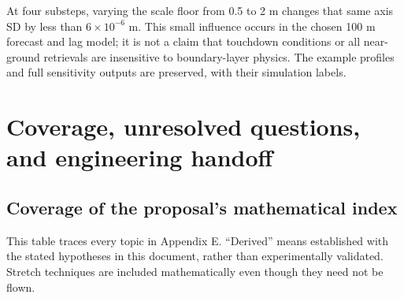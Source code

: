 \documentclass[11pt,a4paper]{article}
\numberwithin{equation}{section}
\begin{document}
At four substeps, varying the scale floor from 0.5 to 2 m changes that same axis SD by less than $6\times10^{-6}$ m. This small influence occurs in the chosen 100 m forecast and lag model; it is not a claim that touchdown conditions or all near-ground retrievals are insensitive to boundary-layer physics. The example profiles and full sensitivity outputs are preserved, with their simulation labels.

\section{Coverage, unresolved questions, and engineering handoff}
\label{sec:handoff}
\subsection{Coverage of the proposal's mathematical index}
This table traces every topic in Appendix E. ``Derived'' means established with the stated hypotheses in this document, rather than experimentally validated. Stretch techniques are included mathematically even though they need not be flown.
\end{document}
